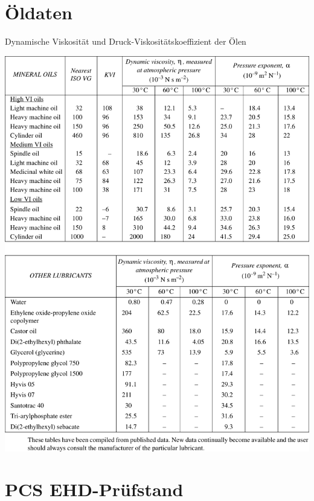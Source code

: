 \begin{appendices}
    \chapter{Öldaten}
        \begin{table}
            \caption{Dynamische Viskosität und Druck-Viskositätskoeffizient der Ölen \cite{esdu_1985}}
            \includegraphics{./tables/esdu_oils_table.pdf}
            \label{tab:esdu_oil_daten}
        \end{table}

    \chapter{PCS EHD-Prüfstand}

\end{appendices}
